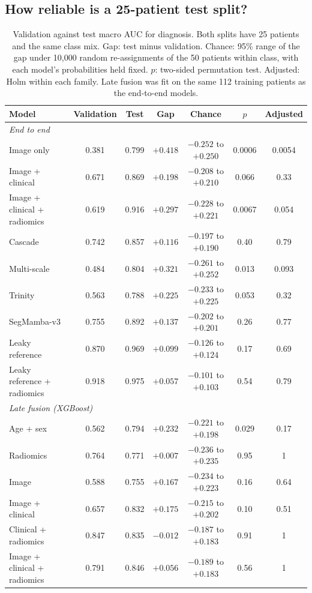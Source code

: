 \documentclass[11pt]{article}
\begin{document}
\subsection{How reliable is a 25-patient test split?}
\begin{table}[t]
\centering
\caption{Validation against test macro AUC for diagnosis. Both splits have 25 patients and the same class mix. Gap:
test minus validation. Chance: 95\% range of the gap under 10,000 random re-assignments of the 50 patients within
class, with each model's probabilities held fixed. $p$: two-sided permutation test. Adjusted: Holm within each family.
Late fusion was fit on the same 112 training patients as the end-to-end models.}
\label{tab:valtest}
\small
\begin{tabular}{lcccccc}
\toprule
Model & Validation & Test & Gap & Chance & $p$ & Adjusted \\
\midrule
\multicolumn{7}{l}{\emph{End to end}} \\
Image only & 0.381 & 0.799 & $+0.418$ & $-0.252$ to $+0.250$ & 0.0006 & 0.0054 \\
Image + clinical & 0.671 & 0.869 & $+0.198$ & $-0.208$ to $+0.210$ & 0.066 & 0.33 \\
Image + clinical + radiomics & 0.619 & 0.916 & $+0.297$ & $-0.228$ to $+0.221$ & 0.0067 & 0.054 \\
Cascade & 0.742 & 0.857 & $+0.116$ & $-0.197$ to $+0.190$ & 0.40 & 0.79 \\
Multi-scale & 0.484 & 0.804 & $+0.321$ & $-0.261$ to $+0.252$ & 0.013 & 0.093 \\
Trinity & 0.563 & 0.788 & $+0.225$ & $-0.233$ to $+0.225$ & 0.053 & 0.32 \\
SegMamba-v3 & 0.755 & 0.892 & $+0.137$ & $-0.202$ to $+0.201$ & 0.26 & 0.77 \\
Leaky reference & 0.870 & 0.969 & $+0.099$ & $-0.126$ to $+0.124$ & 0.17 & 0.69 \\
Leaky reference + radiomics & 0.918 & 0.975 & $+0.057$ & $-0.101$ to $+0.103$ & 0.54 & 0.79 \\
\midrule
\multicolumn{7}{l}{\emph{Late fusion (XGBoost)}} \\
Age + sex & 0.562 & 0.794 & $+0.232$ & $-0.221$ to $+0.198$ & 0.029 & 0.17 \\
Radiomics & 0.764 & 0.771 & $+0.007$ & $-0.236$ to $+0.235$ & 0.95 & 1 \\
Image & 0.588 & 0.755 & $+0.167$ & $-0.234$ to $+0.223$ & 0.16 & 0.64 \\
Image + clinical & 0.657 & 0.832 & $+0.175$ & $-0.215$ to $+0.202$ & 0.10 & 0.51 \\
Clinical + radiomics & 0.847 & 0.835 & $-0.012$ & $-0.187$ to $+0.183$ & 0.91 & 1 \\
Image + clinical + radiomics & 0.791 & 0.846 & $+0.056$ & $-0.189$ to $+0.183$ & 0.56 & 1 \\
\bottomrule
\end{tabular}
\end{table}
\end{document}
